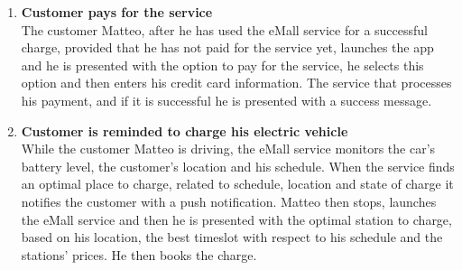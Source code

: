 \begin{enumerate}
    \item \textbf{Customer pays for the service}\\
    The customer Matteo, after he has used the eMall service for a successful charge, provided that he has not paid for the service yet,
    launches the app and he is presented with the option to pay for the service, 
    he selects this option and then enters his credit card information.
    The service that processes his payment, and if it is successful he is presented with a success message.
    \item \textbf{Customer is reminded to charge his electric vehicle}\\
    While the customer Matteo is driving, the eMall service monitors the car's battery level, the customer's location and his schedule. 
    When the service finds an optimal place to charge, related to schedule, location and state of charge it notifies the customer with a push notification.
    Matteo then stops, launches the eMall service and then he is presented with the optimal station to charge, based on his location, the best timeslot with respect to his schedule and the stations' prices. He then books the charge.
    

\end{enumerate}
